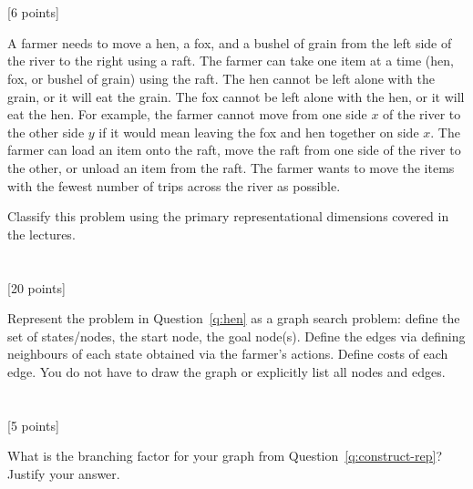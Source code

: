 \documentclass[10pt]{article}
\newcommand{\tcv}[1]{\textcolor{m4}{#1}}
\newcounter{totalpoints}
\newcommand{\points}[1]{{\addtocounter{totalpoints}{#1}\tcv{[#1 points]}}}
\begin{document}

\clearpage\section{} 
\points{6} \label{q:hen}
A farmer needs to move a hen, a fox, and a bushel of grain from the left side of the river to the right using a raft.
The farmer can take one item at a time (hen, fox, or bushel of grain) using the raft.
The hen cannot be left alone with the grain, or it will eat the grain.
The fox cannot be left alone with the hen, or it will eat the hen.
For example, the farmer cannot move from one side $x$ of the river to the other side $y$ if it would mean leaving the fox and hen together on side $x$.
%
The farmer can load an item onto the raft, move the raft from one side of the river to the other, or unload an item from the raft.  The farmer wants to move the items with the fewest number of trips across the river as possible.

Classify this problem using the primary representational dimensions covered in the lectures.

\begin{answer}{0.5in}
\end{answer}

\section{}
\points{20} \label{q:construct-rep}
Represent the problem in Question~\ref{q:hen} as a graph search problem: define the set of states/nodes, the start node, the goal node(s). Define the edges via defining neighbours of each state obtained via the farmer's actions. Define costs of each edge. You do not have to draw the graph or explicitly list all nodes and edges.

\begin{answer}{3in}
\end{answer}

\clearpage\section{} \points{5}
What is the branching factor for your graph from Question~\ref{q:construct-rep}?  Justify your answer.

\begin{answer}{2in}
\end{answer}
\end{document}
